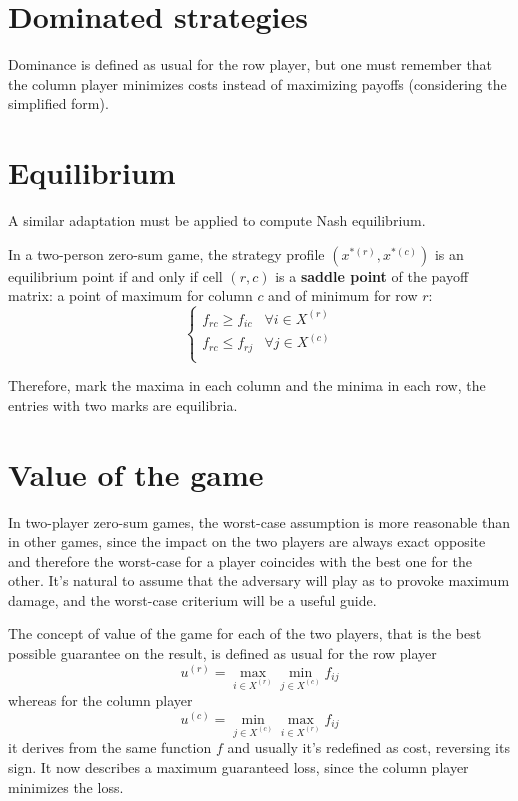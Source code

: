 \section{Dominated strategies}
\label{sec:domstrat}

Dominance is defined as usual for the row player, but one must remember that the column player minimizes costs instead of maximizing payoffs (considering the simplified form).

\section{Equilibrium}

A similar adaptation must be applied to compute Nash equilibrium. \\

\begin{definition}
	In a two-person zero-sum game, the strategy profile $\left(x^{\ast (r)}, x^{\ast (c)}\right)$ is an equilibrium point if and only if cell $(r,c)$ is a \textbf{saddle point} of the payoff matrix: a point of maximum for column $c$ and of minimum for row $r$:
	$$ \begin{cases}
		f_{rc} \geq f_{ic} & \forall i \in X^{(r)} \\
		f_{rc} \leq f_{rj} & \forall j \in X^{(c)} \\
	\end{cases}$$
\end{definition}

Therefore, mark the maxima in each column and the minima in each row, the entries with two marks are equilibria.

\section{Value of the game}

In two-player zero-sum games, the worst-case assumption is more reasonable than in other games, since the impact on the two players are always exact opposite and therefore the worst-case for a player coincides with the best one for the other. It's natural to assume that the adversary will play as to provoke maximum damage, and the worst-case criterium will be a useful guide.

The concept of value of the game for each of the two players, that is the best possible guarantee on the result, is defined as usual for the row player
$$ u^{(r)} = \max_{i \in X^{(r)}} \min_{j \in X^{(c)}} f_{ij} $$
whereas for the column player
$$ u^{(c)} = \min_{j \in X^{(c)}} \max_{i \in X^{(r)}} f_{ij}$$
it derives from the same function $f$ and usually it's redefined as cost, reversing its sign. It now describes a maximum guaranteed loss, since the column player minimizes the loss.

